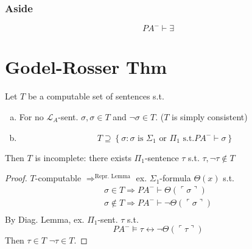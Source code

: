\documentclass[12pt]{article}
\newcommand{\proves}{\vdash}
\newcommand{\gn}[1]{\ulcorner #1 \urcorner}
\begin{document}
\subsubsection*{Aside}
\[
PA^- \proves \exists
\]

\section*{Godel-Rosser Thm}
Let $T$ be a computable set of sentences s.t.
\begin{enumerate}[(a)]
  \item For no $\mathcal{L}_A$-sent. $\sigma, \sigma \in T$ and $\neg\sigma \in T$. ($T$ is simply consistent)
  \item 
    \[
T \supseteq \left\{ \sigma : \sigma \text{ is $\Sigma_1$ or $\Pi_1$ s.t.} PA^- \proves \sigma  \right\}
    \]
\end{enumerate}
Then $T$ is incomplete: there exists $\Pi_1$-sentence $\tau$ s.t.
$\tau, \neg \tau \not\in T$

\begin{proof}
  $T$-computable  $\Rightarrow^\text{Repr. Lemma}$ ex. $\Sigma_1$-formula
  $\Theta(x)$ s.t.
\begin{align*}
  \sigma \in T \Rightarrow PA^- \proves \Theta(\gn{\sigma}) \\
  \sigma \not\in T \Rightarrow PA^- \proves \neg \Theta(\gn{\sigma}) \\
\end{align*}
By Diag. Lemma, ex. $\Pi_1$-sent. $\tau$ s.t.
\[
PA^- \models \tau \leftrightarrow \neg \Theta( \gn{\tau})
\]
Then $\tau \in T$
$\neg \tau \in T$.
\end{proof}
\end{document}
